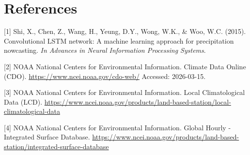 \documentclass{article}
\begin{document}
\section*{References}

\medskip
{
\small
[1] Shi, X., Chen, Z., Wang, H., Yeung, D.Y., Wong, W.K., \& Woo, W.C. (2015). Convolutional LSTM network: A machine learning approach for precipitation nowcasting. \textit{In Advances in Neural Information Processing Systems}.

[2] NOAA National Centers for Environmental Information. Climate Data Online (CDO). \url{https://www.ncei.noaa.gov/cdo-web/} Accessed: 2026-03-15.

[3] NOAA National Centers for Environmental Information. Local Climatological Data (LCD). \url{https://www.ncei.noaa.gov/products/land-based-station/local-climatological-data}

[4] NOAA National Centers for Environmental Information. Global Hourly - Integrated Surface Database. \url{https://www.ncei.noaa.gov/products/land-based-station/integrated-surface-database}
}
\end{document}

